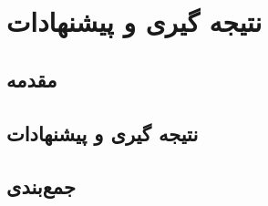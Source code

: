 \chapter{نتیجه گیری و پیشنهادات}
\section{مقدمه}

\section{نتیجه گیری و پیشنهادات}

\section{جمع‌بندی}